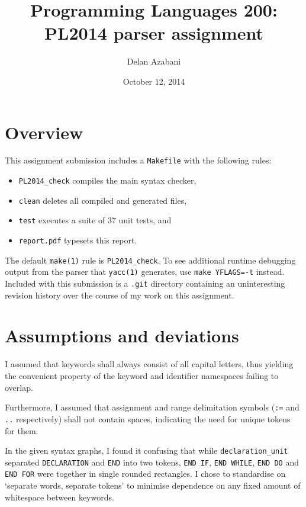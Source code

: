 \documentclass[a4paper,titlepage,12pt]{article}
\title{Programming Languages 200:\\PL2014 parser assignment}
\date{October 12, 2014}
\author{Delan Azabani}
\begin{document}
\maketitle


\section{Overview}

This assignment submission includes a \texttt{Makefile} with the
following rules:

\begin{itemize}
	\item\texttt{PL2014\_check} compiles the main syntax checker,
	\item\texttt{clean} deletes all compiled and generated files,
	\item\texttt{test} executes a suite of 37 unit tests, and
	\item\texttt{report.pdf} typesets this report.
\end{itemize}

The default \texttt{make(1)} rule is \texttt{PL2014\_check}. To see
additional runtime debugging output from the parser that
\texttt{yacc(1)} generates, use \texttt{make YFLAGS=-t} instead.
Included with this submission is a \texttt{.git} directory containing
an uninteresting revision history over the course of my work on this
assignment.

\section{Assumptions and deviations}

I assumed that keywords shall always consist of all capital letters,
thus yielding the convenient property of the keyword and identifier
namespaces failing to overlap.

Furthermore, I assumed that assignment and range delimitation symbols
(\texttt{:=} and \texttt{..} respectively) shall not contain spaces,
indicating the need for unique tokens for them.

In the given syntax graphs, I found it confusing that while
\texttt{declaration\_unit} separated \texttt{DECLARATION} and
\texttt{END} into two tokens, \texttt{END IF}, \texttt{END WHILE},
\texttt{END DO} and \texttt{END FOR} were together in single
rounded rectangles. I chose to standardise on `separate words, separate
tokens' to minimise dependence on any fixed amount of whitespace
between keywords.
\end{document}
